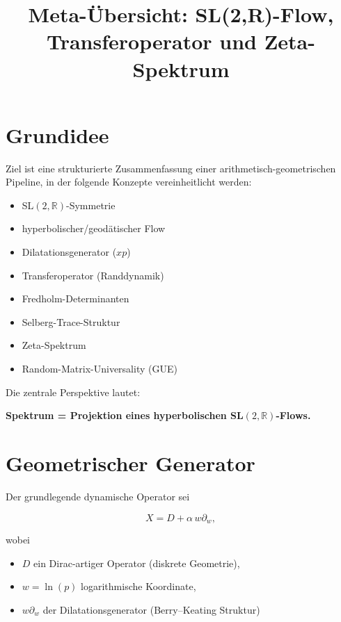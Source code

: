 \documentclass[a4paper,11pt]{article}
\title{\textbf{Meta-Übersicht: SL(2,R)-Flow, Transferoperator und Zeta-Spektrum}}
\author{}
\date{}
\begin{document}
	\maketitle
	
	\section{Grundidee}
	
	Ziel ist eine strukturierte Zusammenfassung einer arithmetisch-geometrischen
	Pipeline, in der folgende Konzepte vereinheitlicht werden:
	
	\begin{itemize}
		\item SL$(2,\mathbb{R})$-Symmetrie
		\item hyperbolischer/geodätischer Flow
		\item Dilatationsgenerator ($xp$)
		\item Transferoperator (Randdynamik)
		\item Fredholm-Determinanten
		\item Selberg-Trace-Struktur
		\item Zeta-Spektrum
		\item Random-Matrix-Universality (GUE)
	\end{itemize}
	
	Die zentrale Perspektive lautet:
	
	\begin{center}
		\textbf{Spektrum = Projektion eines hyperbolischen SL$(2,\mathbb{R})$-Flows.}
	\end{center}
	
	\section{Geometrischer Generator}
	
	Der grundlegende dynamische Operator sei
	
	\[
	X = D + \alpha\, w\partial_w,
	\]
	
	wobei
	
	\begin{itemize}
		\item $D$ ein Dirac-artiger Operator (diskrete Geometrie),
		\item $w=\ln(p)$ logarithmische Koordinate,
		\item $w\partial_w$ der Dilatationsgenerator (Berry--Keating Struktur)
	\end{itemize}
	
\end{document}
